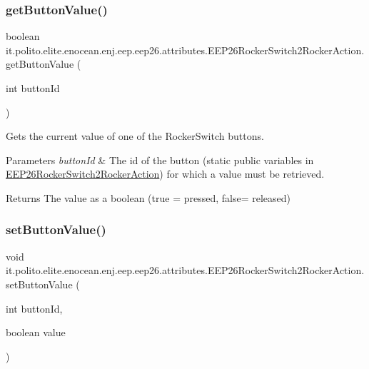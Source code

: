 \subsubsection{\texorpdfstring{get\+Button\+Value()}{getButtonValue()}}
{\footnotesize\ttfamily boolean it.\+polito.\+elite.\+enocean.\+enj.\+eep.\+eep26.\+attributes.\+E\+E\+P26\+Rocker\+Switch2\+Rocker\+Action.\+get\+Button\+Value (\begin{DoxyParamCaption}\item[{int}]{button\+Id }\end{DoxyParamCaption})}

Gets the current value of one of the Rocker\+Switch buttons.


\begin{DoxyParams}{Parameters}
{\em button\+Id} & The id of the button (static public variables in \hyperlink{classit_1_1polito_1_1elite_1_1enocean_1_1enj_1_1eep_1_1eep26_1_1attributes_1_1_e_e_p26_rocker_switch2_rocker_action}{E\+E\+P26\+Rocker\+Switch2\+Rocker\+Action}) for which a value must be retrieved. \\
\hline
\end{DoxyParams}
\begin{DoxyReturn}{Returns}
The value as a boolean (true = pressed, false= released) 
\end{DoxyReturn}
\hypertarget{classit_1_1polito_1_1elite_1_1enocean_1_1enj_1_1eep_1_1eep26_1_1attributes_1_1_e_e_p26_rocker_switch2_rocker_action_afc95a51ad47899ed591c50711308f67f}{}\label{classit_1_1polito_1_1elite_1_1enocean_1_1enj_1_1eep_1_1eep26_1_1attributes_1_1_e_e_p26_rocker_switch2_rocker_action_afc95a51ad47899ed591c50711308f67f} 
\subsubsection{\texorpdfstring{set\+Button\+Value()}{setButtonValue()}}
{\footnotesize\ttfamily void it.\+polito.\+elite.\+enocean.\+enj.\+eep.\+eep26.\+attributes.\+E\+E\+P26\+Rocker\+Switch2\+Rocker\+Action.\+set\+Button\+Value (\begin{DoxyParamCaption}\item[{int}]{button\+Id,  }\item[{boolean}]{value }\end{DoxyParamCaption})}

